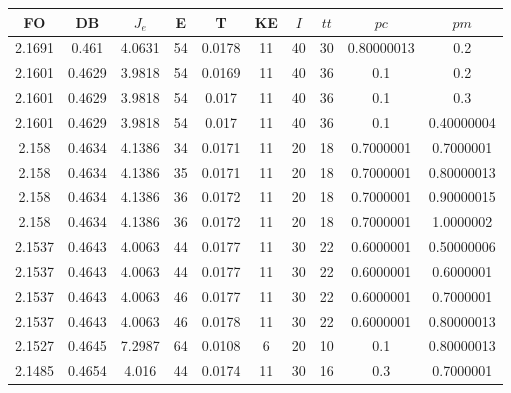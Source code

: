 \begin{table}[h!]
    \footnotesize
    \begin{center}
        \begin{tabular}{|c|c|c|c|c|c|c|c|c|c|}
        \hline
            {\bf FO} & {\bf DB} & $J_e$ & {\bf E} & {\bf T} & {\bf KE} & $I$ & $tt$ & $pc$ & $pm$ \\
        \hline
        \hline
            2.1691 & 0.461  & 4.0631 & 54 & 0.0178 & 11 & 40 & 30 & 0.80000013 & 0.2\\
        \hline
        \hline
            2.1601 & 0.4629  & 3.9818 & 54 & 0.0169 & 11 & 40 & 36 & 0.1 & 0.2\\
        \hline
        \hline
            2.1601 & 0.4629  & 3.9818 & 54 & 0.017 & 11 & 40 & 36 & 0.1 & 0.3\\
        \hline
        \hline
            2.1601 & 0.4629  & 3.9818 & 54 & 0.017 & 11 & 40 & 36 & 0.1 & 0.40000004\\
        \hline
        \hline
            2.158 & 0.4634  & 4.1386 & 34 & 0.0171 & 11 & 20 & 18 & 0.7000001 & 0.7000001\\
        \hline
        \hline
            2.158 & 0.4634  & 4.1386 & 35 & 0.0171 & 11 & 20 & 18 & 0.7000001 & 0.80000013\\
        \hline
        \hline
            2.158 & 0.4634  & 4.1386 & 36 & 0.0172 & 11 & 20 & 18 & 0.7000001 & 0.90000015\\
        \hline
        \hline
            2.158 & 0.4634  & 4.1386 & 36 & 0.0172 & 11 & 20 & 18 & 0.7000001 & 1.0000002\\
        \hline
        \hline
            2.1537 & 0.4643  & 4.0063 & 44 & 0.0177 & 11 & 30 & 22 & 0.6000001 & 0.50000006\\
        \hline
        \hline
            2.1537 & 0.4643  & 4.0063 & 44 & 0.0177 & 11 & 30 & 22 & 0.6000001 & 0.6000001\\
        \hline
        \hline
            2.1537 & 0.4643  & 4.0063 & 46 & 0.0177 & 11 & 30 & 22 & 0.6000001 & 0.7000001\\
        \hline
        \hline
            2.1537 & 0.4643  & 4.0063 & 46 & 0.0178 & 11 & 30 & 22 & 0.6000001 & 0.80000013\\
        \hline
        \hline
            2.1527 & 0.4645  & 7.2987 & 64 & 0.0108 & 6 & 20 & 10 & 0.1 & 0.80000013\\
        \hline
        \hline
            2.1485 & 0.4654  & 4.016 & 44 & 0.0174 & 11 & 30 & 16 & 0.3 & 0.7000001\\

\end{tabular}
\end{center}
\end{table}

